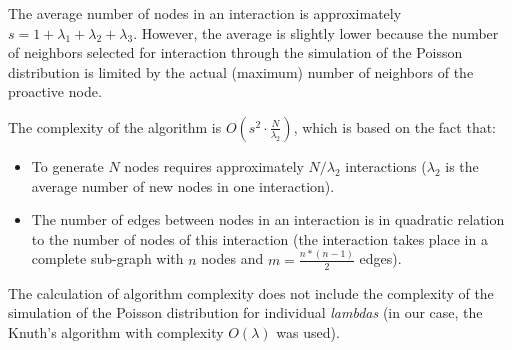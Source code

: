 The average number of nodes in an interaction is approximately  $s = 1 + \lambda_1 + \lambda_2 + \lambda_3$. However, the average is slightly lower because the number of neighbors selected for interaction through the simulation of the Poisson distribution is limited by the actual (maximum) number of neighbors of the proactive node.

The complexity of the algorithm is $O (s^2 \cdot \frac{N}{\lambda_2})$, which is based on the fact that:

\begin{itemize}
	  \item To generate $N$ nodes requires approximately $N / \lambda_2$ interactions ($\lambda_2$ is the average number of new nodes in one interaction).
    \item The number of edges between nodes in an interaction is in quadratic relation to the number of nodes of this interaction (the interaction takes place in a complete sub-graph with $n$ nodes and $m = \frac{n * (n-1)}{2}$ edges).
\end{itemize}

The calculation of algorithm complexity does not include the complexity of the simulation of the Poisson distribution for individual \textit{lambdas} (in our case, the Knuth's algorithm with complexity $O(\lambda)$ was used).
